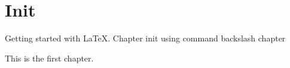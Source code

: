 \documentclass[10pt]{book}
\begin{document}
\chapter{Init}
Getting started with LaTeX. Chapter init using command backslash chapter

This is the first chapter.
\end{document}
